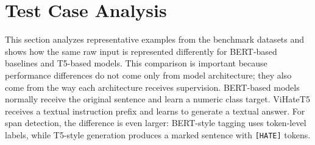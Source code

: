 \documentclass[journal]{IEEEtran}
\begin{document}
\section{Test Case Analysis}
This section analyzes representative examples from the benchmark datasets and shows how the same raw input is represented differently for BERT-based baselines and T5-based models. This comparison is important because performance differences do not come only from model architecture; they also come from the way each architecture receives supervision. BERT-based models normally receive the original sentence and learn a numeric class target. ViHateT5 receives a textual instruction prefix and learns to generate a textual answer. For span detection, the difference is even larger: BERT-style tagging uses token-level labels, while T5-style generation produces a marked sentence with \texttt{[HATE]} tokens.
\end{document}

